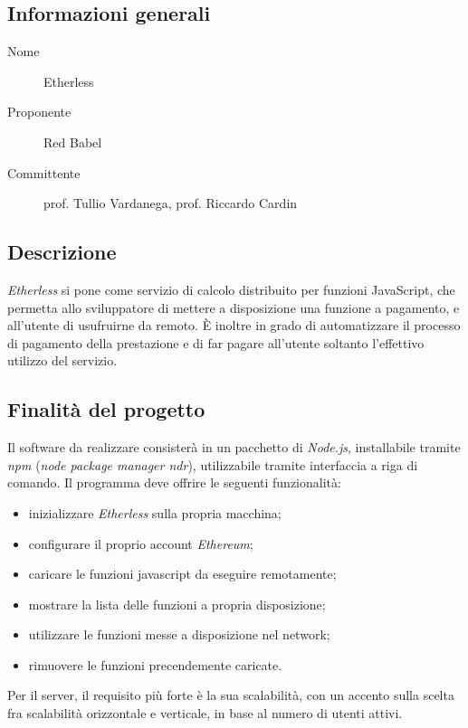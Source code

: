 \documentclass[../studio-di-fattibilita.tex]{subfiles}
\begin{document}
  \subsection{Informazioni generali}%
  \label{subsec:informazioni_generali}
  \begin{description}
    \item[Nome] Etherless
    \item[Proponente] Red Babel
    \item[Committente] prof. Tullio Vardanega, prof. Riccardo Cardin
  \end{description}
  \subsection{Descrizione}%
  \label{subsec:descrizione}
  \textit{Etherless} si pone come servizio di calcolo distribuito per funzioni JavaScript, che permetta allo sviluppatore di mettere a disposizione una funzione a pagamento, e all'utente di usufruirne da remoto. È inoltre in grado di automatizzare il processo di pagamento della prestazione e di far pagare all'utente soltanto l'effettivo utilizzo del servizio.
  \subsection{Finalità del progetto}%
  \label{subsec:finalita_del_progetto}
  Il software da realizzare consisterà in un pacchetto di \textit{Node.js}, installabile tramite \textit{npm} (\textit{node package manager ndr}), utilizzabile tramite interfaccia a riga di comando.
  Il programma deve offrire le seguenti funzionalità:
  \begin{itemize}
    \item inizializzare \textit{Etherless} sulla propria macchina;
    \item configurare il proprio account \textit{Ethereum};
    \item caricare le funzioni javascript da eseguire remotamente;
    \item mostrare la lista delle funzioni a propria disposizione;
    \item utilizzare le funzioni messe a disposizione nel network;
    \item rimuovere le funzioni precendemente caricate.
  \end{itemize}
  Per il server, il requisito più forte è la sua scalabilità, con un accento sulla scelta fra scalabilità orizzontale e verticale, in base al numero di utenti attivi.
\end{document}
